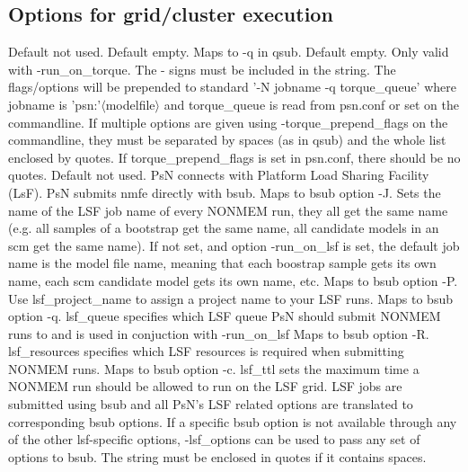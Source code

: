 \subsection{Options for grid/cluster execution}

\begin{optionlist}
Default not used.  
\nextopt
{}
Default empty. Maps to -q in qsub. 
\nextopt
{}
Default empty. Only valid with -run\_on\_torque. The - signs must be included in the string. The flags/options will be prepended to standard '-N jobname -q torque\_queue' where jobname is 'psn:'$\langle$modelfile$\rangle$ and torque\_queue is read from psn.conf or set on the commandline. If multiple options are given using -torque\_prepend\_flags on the commandline, they must be separated by spaces (as in qsub) and the whole list enclosed by quotes. If torque\_prepend\_flags is set in psn.conf, there should be no quotes. 
\nextopt
{}
Default not used. PsN connects with Platform Load Sharing Facility (LsF). PsN submits nmfe directly with bsub. 
\nextopt
{}
Maps to bsub option -J. Sets the name of the LSF job name of every NONMEM run, they all get the same name (e.g. all samples of a bootstrap get the same name, all candidate models in an scm get the same name). If not set, and option -run\_on\_lsf is set, the default job name is the model file name, meaning that each boostrap sample gets its own name, each scm candidate model gets its own name, etc. 
\nextopt
{}
Maps to bsub option -P. Use lsf\_project\_name to assign a project name to your LSF runs. 
\nextopt
{}
Maps to bsub option -q. lsf\_queue specifies which LSF queue PsN should submit NONMEM runs to and is used in conjuction with -run\_on\_lsf 
\nextopt
{}
Maps to bsub option -R. lsf\_resources specifies which LSF resources is required when submitting NONMEM runs. 
\nextopt
{}
Maps to bsub option -c. lsf\_ttl sets the maximum time a NONMEM run should be allowed to run on the LSF grid. 
\nextopt
{}
LSF jobs are submitted using bsub and all PsN's LSF related options are translated to corresponding bsub options. If a specific bsub option is not available through any of the other lsf-specific options, -lsf\_options can be used to pass any set of options to bsub. The string must be enclosed in quotes if it contains spaces. 
\nextopt

\end{optionlist}
